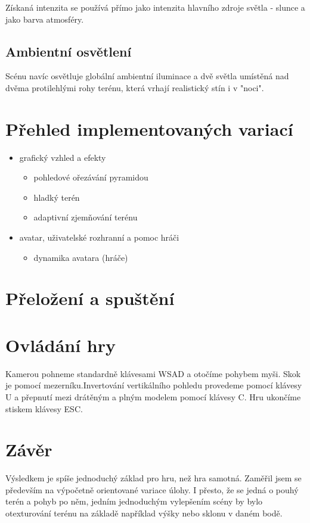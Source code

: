 \documentclass{zcu_sp}
\begin{document}
Získaná intenzita se používá přímo jako intenzita hlavního zdroje světla - slunce a jako barva atmosféry.
\subsection{Ambientní osvětlení}
Scénu navíc osvětluje globální ambientní iluminace a dvě světla umístěná nad
dvěma protilehlými rohy terénu, která vrhají realistický stín i v "noci".

\section{Přehled implementovaných variací}
\begin{itemize}
	\item grafický vzhled a efekty
	\begin{itemize}
		\item pohledové ořezávání pyramidou
		\item hladký terén
		\item adaptivní zjemňování terénu
	\end{itemize}

	\item avatar, uživatelské rozhranní a pomoc hráči
	\begin{itemize}
		\item dynamika avatara (hráče)
	\end{itemize}
\end{itemize}

\section{Přeložení a spuštění}
\section{Ovládání hry}
Kamerou pohneme standardně klávesami WSAD a otočíme pohybem myši. Skok je
pomocí mezerníku.Invertování vertikálního pohledu provedeme pomocí klávesy U a
přepnutí mezi drátěným a plným modelem pomocí klávesy C. Hru ukončíme stiskem
klávesy ESC.

\section{Závěr}
Výsledkem je spíše jednoduchý základ pro hru, než hra samotná. Zaměřil jsem se
především na výpočetně orientované variace úlohy. I přesto, že se jedná o pouhý
terén a pohyb po něm, jedním jednoduchým vylepšením scény by bylo otexturování
terénu na základě například výšky nebo sklonu v daném bodě.
\end{document}
